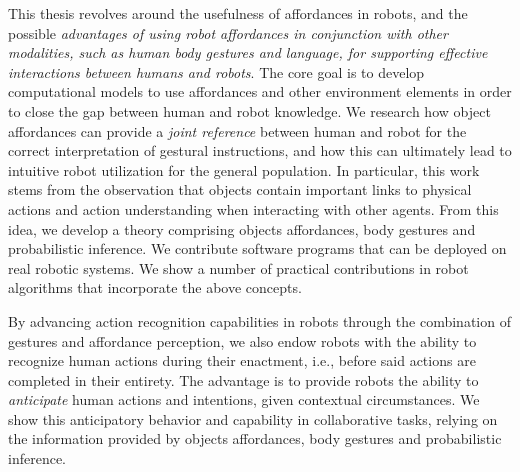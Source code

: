 This thesis revolves around the usefulness of affordances in robots, and the possible \emph{advantages of using robot affordances in conjunction with other modalities, such as human body gestures and language, for supporting effective interactions between humans and robots}.
The core goal is to develop computational models to use affordances and other environment elements in order to close the gap between human and robot knowledge.
We research how object affordances can provide a \emph{joint reference} between human and robot for the correct interpretation of gestural instructions, and how this can ultimately lead to intuitive robot utilization for the general population.
In particular, this work stems from the observation that objects contain important links to physical actions and action understanding when interacting with other agents.
From this idea, we develop a theory comprising objects affordances, body gestures and probabilistic inference.
We contribute software programs that can be deployed on real robotic systems.
We show a number of practical contributions in robot algorithms that incorporate the above concepts.

By advancing action recognition capabilities in robots through the combination of gestures and affordance perception, we also \allowbreak endow \allowbreak robots with the ability to recognize human actions during their enactment, i.e., before said actions are completed in their entirety.
The advantage is to provide robots the ability to \emph{anticipate} human actions and intentions, given contextual circumstances.
We show this anticipatory behavior and capability in \hr{} collaborative tasks, relying on the information provided by objects affordances, body gestures and probabilistic inference.

